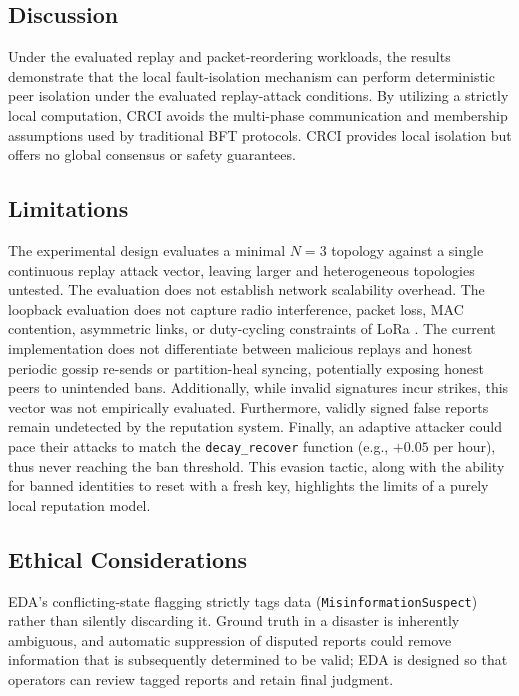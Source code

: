 \documentclass[conference]{IEEEtran}
\begin{document}
\subsection{Discussion}
Under the evaluated replay and packet-reordering workloads, the results demonstrate that the local fault-isolation mechanism can perform deterministic peer isolation under the evaluated replay-attack conditions. By utilizing a strictly local computation, CRCI avoids the multi-phase communication and membership assumptions used by traditional BFT protocols. CRCI provides local isolation but offers no global consensus or safety guarantees.

\subsection{Limitations}
The experimental design evaluates a minimal $N=3$ topology against a single continuous replay attack vector, leaving larger and heterogeneous topologies untested. The evaluation does not establish network scalability overhead. The loopback evaluation does not capture radio interference, packet loss, MAC contention, asymmetric links, or duty-cycling constraints of LoRa \cite{adelantado2017lorawan}. The current implementation does not differentiate between malicious replays and honest periodic gossip re-sends or partition-heal syncing, potentially exposing honest peers to unintended bans. Additionally, while invalid signatures incur strikes, this vector was not empirically evaluated. Furthermore, validly signed false reports remain undetected by the reputation system. Finally, an adaptive attacker could pace their attacks to match the \texttt{decay\_recover} function (e.g., $+0.05$ per hour), thus never reaching the ban threshold. This evasion tactic, along with the ability for banned identities to reset with a fresh key, highlights the limits of a purely local reputation model.

\subsection{Ethical Considerations}
EDA's conflicting-state flagging strictly tags data (\texttt{MisinformationSuspect}) rather than silently discarding it. Ground truth in a disaster is inherently ambiguous, and automatic suppression of disputed reports could remove information that is subsequently determined to be valid; EDA is designed so that operators can review tagged reports and retain final judgment.
\end{document}
